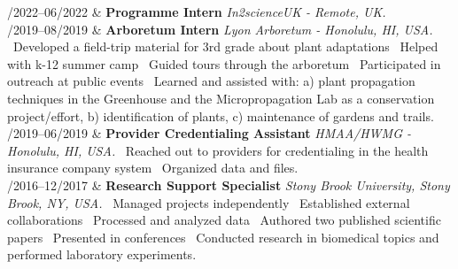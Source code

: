 \documentclass[11pt, a4paper]{article}
\newcommand{\Duration}[2]{\fontsize{10pt}{0}\selectfont #1--#2}
\begin{document}
\begin{EntriesTable}

	\Duration{01/2022}{06/2022}  &
	\textbf{Programme Intern}
	\newline
	\textit{In2scienceUK - Remote, UK.}
	\\


	\Duration{06/2019}{08/2019}  &
	\textbf{Arboretum Intern}
	\newline
	\textit{Lyon Arboretum - Honolulu, HI, USA.}
	\newline
	\textbullet \ Developed a field-trip material for 3rd grade about plant adaptations
	\textbullet \ Helped with k-12 summer camp
	\textbullet \ Guided tours through the arboretum
	\textbullet \ Participated in outreach at public events
	\textbullet \ Learned and assisted with: a) plant propagation techniques in the Greenhouse and
	the Micropropagation Lab as a conservation project/effort, b) identification of plants, c)
	maintenance of gardens and trails.
	\\

	\Duration{03/2019}{06/2019}  &
	\textbf{Provider Credentialing Assistant}
	\newline
	\textit{HMAA/HWMG - Honolulu, HI, USA.}
	\newline
	\textbullet \ Reached out to providers for credentialing in the health insurance company system
	\textbullet \ Organized data and files.
	\\

	\Duration{08/2016}{12/2017}  &
	\textbf{Research Support Specialist}
	\newline
	\textit{Stony Brook University, Stony Brook, NY, USA.}
	\newline
	\textbullet \ Managed projects independently
	\textbullet \ Established external collaborations
	\textbullet \ Processed and analyzed data
	\textbullet \ Authored two published scientific papers
	\textbullet \ Presented in conferences
	\textbullet\ Conducted research in biomedical topics and performed laboratory experiments.
	\\

\end{EntriesTable}
\end{document}
